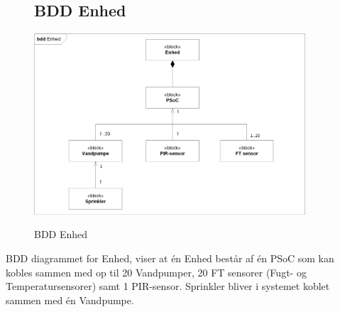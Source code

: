 \begin{figure}[H] \centering
\subsection{BDD Enhed}
{\includegraphics[width=0.9\textwidth]{filer/systemarkitektur/BDD_Enhed}}
\caption{BDD Enhed}
\label{lab:bddenhed}
\raggedright
\end{figure}
BDD diagrammet for Enhed, viser at én Enhed består af én PSoC som kan kobles sammen med op til 20 Vandpumper, 20 FT sensorer (Fugt- og Temperatursensorer) samt 1 PIR-sensor. Sprinkler bliver i systemet koblet sammen med én Vandpumpe.

